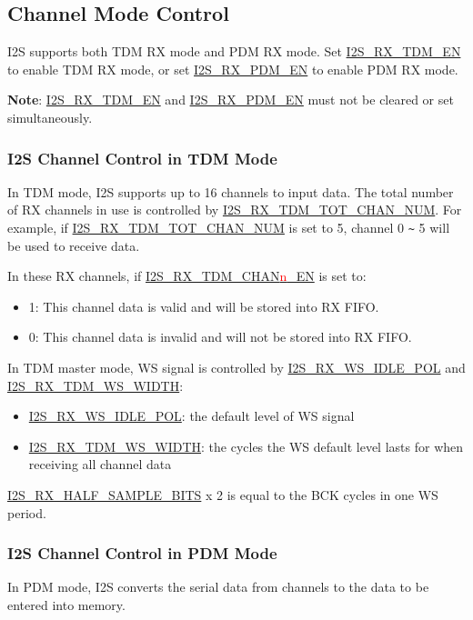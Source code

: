 \documentclass[main\_\_CN.tex]{subfiles}
\begin{document}
\subsection{Channel Mode Control}
\chipname{} I2S supports both TDM RX mode and PDM RX mode. Set  \hyperref[fielddesc:I2SRXTDMEN]{I2S\_RX\_TDM\_EN} to enable TDM RX mode, or set  \hyperref[fielddesc:I2SRXPDMEN]{I2S\_RX\_PDM\_EN} to enable PDM RX mode.

\textbf{Note}: \hyperref[fielddesc:I2SRXTDMEN]{I2S\_RX\_TDM\_EN} and  \hyperref[fielddesc:I2SRXPDMEN]{I2S\_RX\_PDM\_EN} must not be cleared or set simultaneously.

\subsubsection{I2S Channel Control in TDM Mode}
In TDM mode, I2S supports up to 16 channels to input data. The total number of RX channels in use is controlled by  \hyperref[fielddesc:I2SRXTDMTOTCHANNUM]{I2S\_RX\_TDM\_TOT\_CHAN\_NUM}. For example, if  \hyperref[fielddesc:I2SRXTDMTOTCHANNUM]{I2S\_RX\_TDM\_TOT\_CHAN\_NUM} is set to 5, channel 0 \verb+~+ 5 will be used to receive data.

In these RX channels, if  \hyperref[fielddesc:I2STXTDMCHAN0EN]{I2S\_RX\_TDM\_CHAN{\textcolor{red}{n}}\_EN}  is set to:
\begin{itemize}
    \item 1: This channel data is valid and will be stored into RX FIFO.
    \item 0: This channel data is invalid and will not be stored into RX FIFO.
\end{itemize}
In TDM master mode, WS signal is controlled by  \hyperref[fielddesc:I2SRXWSIDLEPOL]{I2S\_RX\_WS\_IDLE\_POL} and  \hyperref[fielddesc:I2SRXTDMWSWIDTH]{I2S\_RX\_TDM\_WS\_WIDTH}:
\begin{itemize}
\item \hyperref[fielddesc:I2SRXWSIDLEPOL]{I2S\_RX\_WS\_IDLE\_POL}: the default level of WS signal
\item \hyperref[fielddesc:I2SRXTDMWSWIDTH]{I2S\_RX\_TDM\_WS\_WIDTH}: the cycles the WS default level lasts for when receiving all channel data
\end{itemize} \hyperref[fielddesc:I2SRXHALFSAMPLEBITS]{I2S\_RX\_HALF\_SAMPLE\_BITS} x 2 is equal to the BCK cycles in one WS period.


\subsubsection{I2S Channel Control in PDM Mode}
In PDM mode, I2S converts the serial data from channels to the data to be entered into memory.
\end{document}
